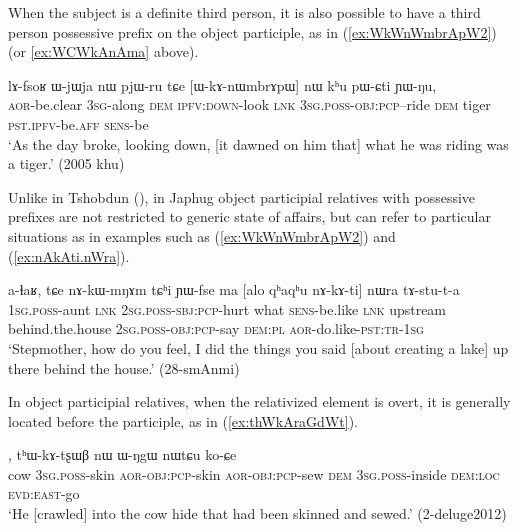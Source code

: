 When the subject is a definite third person, it is also possible to have a third person possessive prefix on the object participle, as in (\ref{ex:WkWnWmbrApW2}) (or \ref{ex:WCWkAnAma} above).

\begin{exe}
\ex \label{ex:WkWnWmbrApW2}
\gll  lɤ-fsoʁ ɯ-jɯja nɯ pjɯ-ru tɕe [ɯ-kɤ-nɯmbrɤpɯ] nɯ kʰu pɯ-ɕti ɲɯ-ŋu,  \\
\textsc{aor}-be.clear    \textsc{3sg}-along  \textsc{dem} \textsc{ipfv}:\textsc{down}-look \textsc{lnk} \textsc{3sg}.\textsc{poss}-\textsc{obj}:\textsc{pcp}--ride \textsc{dem} tiger \textsc{pst}.\textsc{ipfv}-be.\textsc{aff}  \textsc{sens}-be \\
\glt `As the day broke, looking down, [it dawned on him that] what he was riding was a tiger.' (2005 khu)
\end{exe}

Unlike in Tshobdun (\citealt[10]{jacksonlin07}), in Japhug object participial relatives with possessive prefixes are not restricted to generic state of affairs, but can refer to particular situations as in examples such as (\ref{ex:WkWnWmbrApW2}) and (\ref{ex:nAkAti.nWra}).

\begin{exe}
\ex \label{ex:nAkAti.nWra}
\gll a-ɬaʁ, tɕe nɤ-kɯ-mŋɤm tɕʰi ɲɯ-fse ma [alo qʰaqʰu nɤ-kɤ-ti] nɯra tɤ-stu-t-a \\
\textsc{1sg}.\textsc{poss}-aunt \textsc{lnk} \textsc{2sg}.\textsc{poss}-\textsc{sbj}:\textsc{pcp}-hurt what \textsc{sens}-be.like \textsc{lnk} upstream behind.the.house \textsc{2sg}.\textsc{poss}-\textsc{obj}:\textsc{pcp}-say \textsc{dem}:\textsc{pl} \textsc{aor}-do.like-\textsc{pst}:\textsc{tr}-\textsc{1sg} \\
\glt `Stepmother, how do you feel, I did the things you said [about creating a lake] up there behind the house.' (28-smAnmi)
\end{exe}


In object participial relatives, when the relativized element is overt, it is generally located before the participle, as in (\ref{ex:thWkAraGdWt}). 

\begin{exe}
\ex \label{ex:thWkAraGdWt}
, tʰɯ-kɤ-tʂɯβ nɯ ɯ-ŋgɯ nɯtɕu ko-ɕe  \\
cow \textsc{3sg}.\textsc{poss}-skin \textsc{aor}-\textsc{obj}:\textsc{pcp}-skin \textsc{aor}-\textsc{obj}:\textsc{pcp}-sew \textsc{dem} \textsc{3sg}.\textsc{poss}-inside \textsc{dem}:\textsc{loc} \textsc{evd}:\textsc{east}-go \\
\glt  `He [crawled] into the cow hide that had been skinned and sewed.'  (2-deluge2012) 	
\end{exe}  

